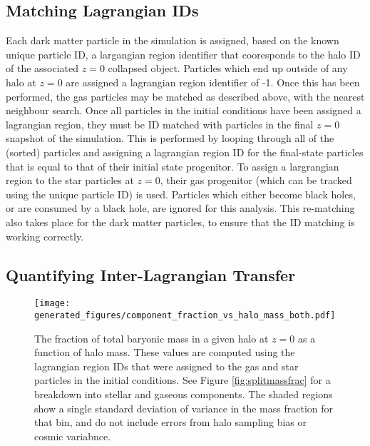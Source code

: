 
\subsection{Matching Lagrangian IDs}

Each dark matter particle in the simulation is assigned, based on the known
unique particle ID, a largangian region identifier that cooresponds to the halo
ID of the associated $z=0$ collapsed object. Particles which end up outside of
any halo at $z=0$ are assigned a lagrangian region identifier of -1. Once this
has been performed, the gas particles may be matched as described above, with
the nearest neighbour search. Once all particles in the initial conditions have
been assigned a lagrangian region, they must be ID matched with particles in
the final $z=0$ snapshot of the simulation. This is performed by looping
through all of the (sorted) particles and assigning a lagrangian region ID for
the final-state particles that is equal to that of their initial state
progenitor. To assign a largrangian region to the star particles at $z=0$,
their gas progenitor (which can be tracked using the unique particle ID) is
used. Particles which either become black holes, or are consumed by a black
hole, are ignored for this analysis. This re-matching also takes place for the
dark matter particles, to ensure that the ID matching is working correctly.


\subsection{Quantifying Inter-Lagrangian Transfer}

\begin{figure} \centering
	\texttt{[image: generated\_figures/component\_fraction\_vs\_halo\_mass\_both.pdf]}
	\caption{The fraction of total baryonic mass in a given halo at $z=0$
	as a function of halo mass. These values are computed using the
	lagrangian region IDs that were assigned to the gas and star particles
	in the initial conditions. See Figure \ref{fig:splitmassfrac} for a
	breakdown into stellar and gaseous components. The shaded regions show
	a single standard deviation of variance in the mass fraction for that
	bin, and do not include errors from halo sampling bias or cosmic
	variabnce. } \label{fig:massfrac} \end{figure}

